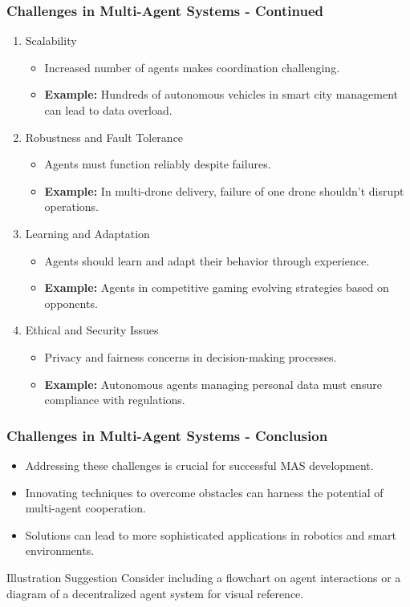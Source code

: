 \documentclass[aspectratio=169]{beamer}
\begin{document}
\begin{frame}[fragile]
    \frametitle{Challenges in Multi-Agent Systems - Continued}
    \begin{enumerate}[resume]
        \item Scalability
            \begin{itemize}
                \item Increased number of agents makes coordination challenging.
                \item \textbf{Example:} Hundreds of autonomous vehicles in smart city management can lead to data overload.
            \end{itemize}
        \item Robustness and Fault Tolerance
            \begin{itemize}
                \item Agents must function reliably despite failures.
                \item \textbf{Example:} In multi-drone delivery, failure of one drone shouldn't disrupt operations.
            \end{itemize}
        \item Learning and Adaptation
            \begin{itemize}
                \item Agents should learn and adapt their behavior through experience.
                \item \textbf{Example:} Agents in competitive gaming evolving strategies based on opponents.
            \end{itemize}
        \item Ethical and Security Issues
            \begin{itemize}
                \item Privacy and fairness concerns in decision-making processes.
                \item \textbf{Example:} Autonomous agents managing personal data must ensure compliance with regulations.
            \end{itemize}
    \end{enumerate}
\end{frame}

\begin{frame}[fragile]
    \frametitle{Challenges in Multi-Agent Systems - Conclusion}
    \begin{itemize}
        \item Addressing these challenges is crucial for successful MAS development.
        \item Innovating techniques to overcome obstacles can harness the potential of multi-agent cooperation.
        \item Solutions can lead to more sophisticated applications in robotics and smart environments.
    \end{itemize}
    \begin{block}{Illustration Suggestion}
        Consider including a flowchart on agent interactions or a diagram of a decentralized agent system for visual reference.
    \end{block}
\end{frame}
\end{document}
